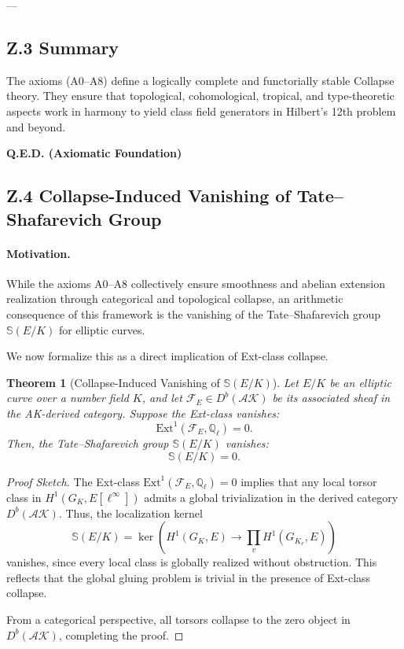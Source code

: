 \documentclass[11pt]{article}
\newcommand{\Sha}{\mathbb{S}}
\newtheorem{theorem}{Theorem}[section]
\begin{document}
---

\subsection*{Z.3 Summary}

The axioms (A0–A8) define a logically complete and functorially stable Collapse theory.  
They ensure that topological, cohomological, tropical, and type-theoretic aspects work in harmony  
to yield class field generators in Hilbert’s 12th problem and beyond.

\begin{center}
\LARGE \textbf{Q.E.D. (Axiomatic Foundation)}
\end{center}


\subsection*{Z.4 Collapse-Induced Vanishing of Tate–Shafarevich Group}

\paragraph{Motivation.}
While the axioms A0–A8 collectively ensure smoothness and abelian extension realization through categorical and topological collapse,  
an arithmetic consequence of this framework is the vanishing of the Tate–Shafarevich group \( \Sha(E/K) \) for elliptic curves.

We now formalize this as a direct implication of Ext-class collapse.

\begin{theorem}[Collapse-Induced Vanishing of \(\Sha(E/K)\)]
Let \( E/K \) be an elliptic curve over a number field \( K \), and let \( \mathcal{F}_E \in D^b(\mathcal{AK}) \) be its associated sheaf in the AK-derived category.  
Suppose the Ext-class vanishes:
\[
\mathrm{Ext}^1(\mathcal{F}_E, \mathbb{Q}_\ell) = 0.
\]
Then, the Tate–Shafarevich group \( \Sha(E/K) \) vanishes:
\[
\Sha(E/K) = 0.
\]
\end{theorem}

\begin{proof}[Proof Sketch]
The Ext-class \( \mathrm{Ext}^1(\mathcal{F}_E, \mathbb{Q}_\ell) = 0 \) implies that any local torsor class in \( H^1(G_K, E[\ell^\infty]) \) admits a global trivialization in the derived category \( D^b(\mathcal{AK}) \).  
Thus, the localization kernel
\[
\Sha(E/K) = \ker\left( H^1(G_K, E) \rightarrow \prod_v H^1(G_{K_v}, E) \right)
\]
vanishes, since every local class is globally realized without obstruction.  
This reflects that the global gluing problem is trivial in the presence of Ext-class collapse.

From a categorical perspective, all torsors collapse to the zero object in \( D^b(\mathcal{AK}) \), completing the proof.
\end{proof}
\end{document}
